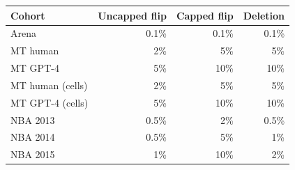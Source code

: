 \begin{tabular}{lrrr}
\toprule
Cohort & Uncapped flip & Capped flip & Deletion \\
\midrule
Arena & 0.1\% & 0.1\% & 0.1\% \\
MT human & 2\% & 5\% & 5\% \\
MT GPT-4 & 5\% & 10\% & 10\% \\
MT human (cells) & 2\% & 5\% & 5\% \\
MT GPT-4 (cells) & 5\% & 10\% & 10\% \\
NBA 2013 & 0.5\% & 2\% & 0.5\% \\
NBA 2014 & 0.5\% & 5\% & 1\% \\
NBA 2015 & 1\% & 10\% & 2\% \\
\bottomrule
\end{tabular}
